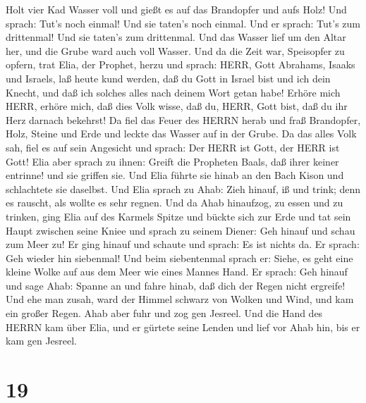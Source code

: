 Holt vier Kad Wasser voll und gießt es auf das Brandopfer und aufs Holz!
Und sprach: Tut's noch einmal! Und sie taten's noch einmal. Und er
sprach: Tut's zum drittenmal! Und sie taten's zum drittenmal.
 Und das Wasser lief um den Altar her, und die Grube ward
auch voll Wasser.  Und da die Zeit war, Speisopfer zu
opfern, trat Elia, der Prophet, herzu und sprach: HERR, Gott Abrahams,
Isaaks und Israels, laß heute kund werden, daß du Gott in Israel bist
und ich dein Knecht, und daß ich solches alles nach deinem Wort getan
habe!  Erhöre mich HERR, erhöre mich, daß dies Volk wisse,
daß du, HERR, Gott bist, daß du ihr Herz darnach bekehrst! 
Da fiel das Feuer des HERRN herab und fraß Brandopfer, Holz, Steine und
Erde und leckte das Wasser auf in der Grube.  Da das alles
Volk sah, fiel es auf sein Angesicht und sprach: Der HERR ist Gott, der
HERR ist Gott!  Elia aber sprach zu ihnen: Greift die
Propheten Baals, daß ihrer keiner entrinne! und sie griffen sie. Und
Elia führte sie hinab an den Bach Kison und schlachtete sie daselbst.
 Und Elia sprach zu Ahab: Zieh hinauf, iß und trink; denn
es rauscht, als wollte es sehr regnen.  Und da Ahab
hinaufzog, zu essen und zu trinken, ging Elia auf des Karmels Spitze und
bückte sich zur Erde und tat sein Haupt zwischen seine Kniee
 und sprach zu seinem Diener: Geh hinauf und schau zum Meer
zu! Er ging hinauf und schaute und sprach: Es ist nichts da. Er sprach:
Geh wieder hin siebenmal!  Und beim siebentenmal sprach er:
Siehe, es geht eine kleine Wolke auf aus dem Meer wie eines Mannes Hand.
Er sprach: Geh hinauf und sage Ahab: Spanne an und fahre hinab, daß dich
der Regen nicht ergreife!  Und ehe man zusah, ward der
Himmel schwarz von Wolken und Wind, und kam ein großer Regen. Ahab aber
fuhr und zog gen Jesreel.  Und die Hand des HERRN kam über
Elia, und er gürtete seine Lenden und lief vor Ahab hin, bis er kam gen
Jesreel.

\hypertarget{section-18}{%
\section{19}\label{section-18}}

